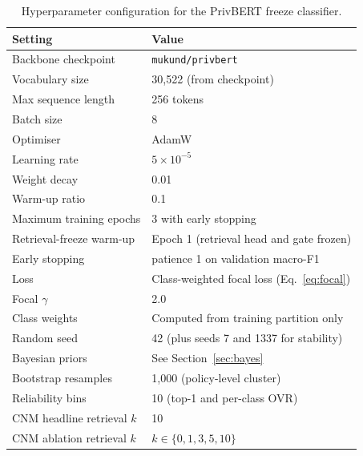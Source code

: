 \documentclass[final,3p,times,twocolumn]{elsarticle}
\begin{document}
	\begin{table}[h]
		\centering
		\caption{Hyperparameter configuration for the PrivBERT freeze classifier.}
		\label{tab:hparams} 
        
        \footnotesize
		\setlength{\tabcolsep}{3pt}
		\begin{tabular}{@{}l l@{}}
			\toprule \textbf{Setting}    & \textbf{Value}                                 \\
			\midrule Backbone checkpoint & \texttt{mukund/privbert}                       \\
			Vocabulary size              & 30{,}522 (from checkpoint)                     \\
			Max sequence length          & 256 tokens                                     \\
			Batch size                   & 8                                              \\
			Optimiser                    & AdamW                                          \\
			Learning rate                & $5\times10^{-5}$                               \\
			Weight decay                 & 0.01                                           \\
			Warm-up ratio                & 0.1                                            \\
			Maximum training epochs& 3 with early stopping\\
			Retrieval-freeze warm-up     & Epoch 1 (retrieval head and gate frozen)       \\
			Early stopping               & patience 1 on validation macro-F1              \\
			Loss                         & Class-weighted focal loss (Eq.~\ref{eq:focal}) \\
			Focal $\gamma$               & 2.0                                            \\
			Class weights                & Computed from training partition only          \\
			Random seed                  & 42 (plus seeds 7 and 1337 for stability)       \\
			Bayesian priors              & See Section~\ref{sec:bayes}                    \\
			Bootstrap resamples          & 1{,}000 (policy-level cluster)                 \\
			Reliability bins             & 10 (top-1 and per-class OVR)                   \\
			CNM headline retrieval $k$& 10\\
 CNM ablation retrieval $k$&$k\in\{0,1,3,5,10\}$\\ \bottomrule
		\end{tabular}
	\end{table}
\end{document}

